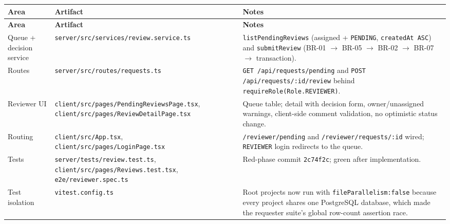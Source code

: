 \documentclass[11pt,a4paper]{article}
\begin{document}
\vspace{0.3em}
\begin{longtable}{|>{\RaggedRight}p{3.5cm}|>{\RaggedRight}p{4.8cm}|>{\RaggedRight}p{7.5cm}|}
\hline
\rowcolor{zenPale}\textbf{Area} & \textbf{Artifact} & \textbf{Notes} \\ \hline
\endfirsthead
\hline
\rowcolor{zenPale}\textbf{Area} & \textbf{Artifact} & \textbf{Notes} \\ \hline
\endhead
\hline
\endfoot
Queue + decision service & \texttt{server/\allowbreak src/\allowbreak services/\allowbreak review.\allowbreak service.\allowbreak ts} & \texttt{listPendingReviews} (assigned + \texttt{PENDING}, \texttt{createdAt ASC}) and \texttt{submitReview} (BR-01 $\rightarrow$ BR-05 $\rightarrow$ BR-02 $\rightarrow$ BR-07 $\rightarrow$ transaction). \\ \hline
Routes & \texttt{server/\allowbreak src/\allowbreak routes/\allowbreak requests.\allowbreak ts} & \texttt{GET /\allowbreak api/\allowbreak requests/\allowbreak pending} and \texttt{POST /\allowbreak api/\allowbreak requests/\allowbreak :\allowbreak id/\allowbreak review} behind \texttt{requireRole(Role.\allowbreak REVIEWER)}. \\ \hline
Reviewer UI & \texttt{client/\allowbreak src/\allowbreak pages/\allowbreak PendingReviewsPage.\allowbreak tsx}, \texttt{client/\allowbreak src/\allowbreak pages/\allowbreak ReviewDetailPage.\allowbreak tsx} & Queue table; detail with decision form, owner/unassigned warnings, client-side comment validation, no optimistic status change. \\ \hline
Routing & \texttt{client/\allowbreak src/\allowbreak App.\allowbreak tsx}, \texttt{client/\allowbreak src/\allowbreak pages/\allowbreak LoginPage.\allowbreak tsx} & \texttt{/\allowbreak reviewer/\allowbreak pending} and \texttt{/\allowbreak reviewer/\allowbreak requests/\allowbreak :\allowbreak id} wired; \texttt{REVIEWER} login redirects to the queue. \\ \hline
Tests & \texttt{server/\allowbreak tests/\allowbreak review.\allowbreak test.\allowbreak ts}, \texttt{client/\allowbreak src/\allowbreak pages/\allowbreak Reviews.\allowbreak test.\allowbreak tsx}, \texttt{e2e/\allowbreak reviewer.\allowbreak spec.\allowbreak ts} & Red-phase commit \texttt{2c74f2c}; green after implementation. \\ \hline
Test isolation & \texttt{vitest.\allowbreak config.\allowbreak ts} & Root projects now run with \texttt{fileParallelism:\allowbreak  false} because every project shares one PostgreSQL database, which made the requester suite's global row-count assertion race. \\ \hline
\end{longtable}
\vspace{0.3em}
\end{document}
